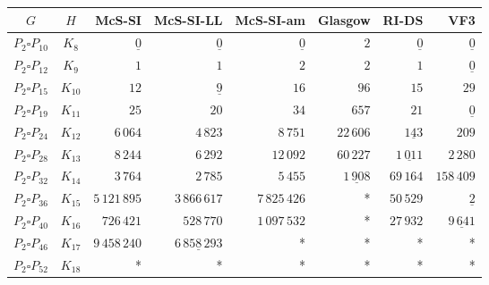 
\begin{tabular}{ccrrrrrr}
    \toprule
    {$G$} & {$H$} & {McS-SI} & {McS-SI-LL} & {McS-SI-am} & Glasgow & RI-DS & VF3\\ 
    \midrule

$P_2\square P_{10}$ & $K_{8}$ & $\underline{0}$ & $\underline{0}$ & $\underline{0}$ & $2$ & $\underline{0}$ & $\underline{0}$\\
$P_2\square P_{12}$ & $K_{9}$ & $1$ & $1$ & $2$ & $2$ & $1$ & $\underline{0}$\\
$P_2\square P_{15}$ & $K_{10}$ & $12$ & $\underline{9}$ & $16$ & $96$ & $15$ & $29$\\
$P_2\square P_{19}$ & $K_{11}$ & $25$ & $20$ & $34$ & $657$ & $21$ & $\underline{0}$\\
$P_2\square P_{24}$ & $K_{12}$ & $6\,064$ & $4\,823$ & $8\,751$ & $22\,606$ & $\underline{143}$ & $209$\\
$P_2\square P_{28}$ & $K_{13}$ & $8\,244$ & $6\,292$ & $12\,092$ & $60\,227$ & $\underline{1\,011}$ & $2\,280$\\
$P_2\square P_{32}$ & $K_{14}$ & $3\,764$ & $2\,785$ & $5\,455$ & $\underline{1\,908}$ & $69\,164$ & $158\,409$\\
$P_2\square P_{36}$ & $K_{15}$ & $5\,121\,895$ & $3\,866\,617$ & $7\,825\,426$ & * & $50\,529$ & $\underline{2}$\\
$P_2\square P_{40}$ & $K_{16}$ & $726\,421$ & $528\,770$ & $1\,097\,532$ & * & $27\,932$ & $\underline{9\,641}$\\
$P_2\square P_{46}$ & $K_{17}$ & $9\,458\,240$ & $\underline{6\,858\,293}$ & * & * & * & *\\
$P_2\square P_{52}$ & $K_{18}$ & * & * & * & * & * & *\\

    \bottomrule
\end{tabular}

